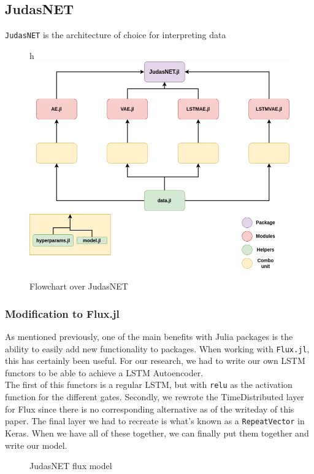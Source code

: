 \subsection{JudasNET}

\texttt{JudasNET} is the architecture of choice for interpreting data

\begin{figure}{h}
    \centering
    \includegraphics[scale=.6]{figures/judasnet.png}
    \caption{Flowchart over JudasNET}
    \label{fig:judasnet}
\end{figure}

\subsubsection{Modification to Flux.jl}

As mentioned previously, one of the main benefits with Julia packages is the ability to easily add new functionality to packages. When working with \texttt{Flux.jl}, this has certainly been useful. For our research, we had to write our own LSTM functors to be able to achieve a LSTM Autoencoder.  \\

The first of this functors is a regular LSTM, but with \texttt{relu} as the activation function for the different gates. Secondly, we rewrote the TimeDistributed layer \cite{keras} for Flux since there is no corresponding alternative as of the writeday of this paper. The final layer we had to recreate is what's known as a \texttt{RepeatVector} in Keras. When we have all of these together, we can finally put them together and write our model. 

\begin{figure}[h]
    \centering
    
    \caption{JudasNET flux model}
    \label{fig:fluxjudasnet}
\end{figure}